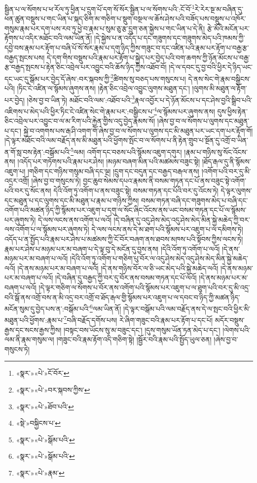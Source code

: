 སྦྱིན་པ་ལ་སོགས་པ་ཕ་རོལ་ཏུ་ཕྱིན་པ་དྲུག་པོ་དག་སོ་སོར་སྦྱིན་པ་ལ་སོགས་པའི་:ངོ་བོ་\footnote{«སྣར་»«པེ་»ངོ་བོར་}རེ་རེར་སྔ་མ་བཞིན་དུ་ཕན་ཚུན་བསྡུས་པ་གང་ཡིན་པ་སྐད་ཅིག་མ་གཅིག་པ་སྡུག་བསྔལ་ལ་ཆོས་ཤེས་པའི་བཟོད་པས་བསྡུས་པ་འཁོར་གསུམ་རྣམ་པར་དག་པས་རབ་ཏུ་ཕྱེ་བ་རྣམ་པ་སུམ་ཅུ་རྩ་དྲུག་ཅན་སྐྱེས་པ་གང་ཡིན་པ་དེ་ནི། རྩེ་མོའི་མངོན་པར་རྟོགས་པ་འདིར་མཐོང་བའི་ལམ་ཡིན་ནོ། །དེ་སྐྱེས་པ་ན་འདོད་པ་དང་གཟུགས་དང་གཟུགས་མེད་པའི་ཁམས་ཀྱི་དབྱེ་བས་རྣམ་པར་རྟོག་པ་བཞི་པོ་སོ་སོར་རྣམ་པ་དགུ་ཉིད་ཀྱིས་གཟུང་བ་དང་འཛིན་པའི་རྣམ་པར་རྟོག་པ་བརྒྱ་རྩ་བརྒྱད་སྤངས་པས། དེ་དག་གིས་བསྡུས་པའི་རྣམ་པར་རྟོག་པ་སྐྱེད་པར་བྱེད་པའི་བག་ཆགས་ཀྱི་ཉོན་མོངས་པ་བརྒྱ་རྩ་བརྒྱད་སྤངས་པ་རྟེན་ཅིང་འབྲེལ་པར་འབྱུང་བའི་ཆོས་ཉིད་ཀྱིས་འཐོབ་བོ། །དེ་ལ་དབང་དུ་བྱ་བའི་ཕྱིར་དེ་ཉིད་ཡང་དང་ཡང་དུ་སྒོམ་པར་བྱེད་དོ་ཞེས་:བར་སྐབས་ཀྱི་\footnote{«སྣར་»«པེ་»བར་སྐབས་ཀྱིས་}ཚིགས་སུ་བཅད་པས་གསུངས་པ། དེ་ནས་སེང་གེ་རྣམ་བསྒྱིངས་པའི། །ཏིང་ངེ་འཛིན་ལ་སྙོམས་ཞུགས་ནས། །རྟེན་ཅིང་འབྲེལ་འབྱུང་ལུགས་མཐུན་དང་། །ལུགས་མི་མཐུན་ལ་རྟོག་པར་བྱེད། །ཅེས་བྱ་བ་ཡིན་ཏེ། མཐོང་བའི་ལམ་:འཐོབ་པའི་\footnote{«སྣར་»«པེ་»ཐོབ་པའི་}རྣལ་འབྱོར་པ་དེ་ཉོན་མོངས་པ་དང་ཤེས་བྱའི་སྒྲིབ་པའི་འཇིགས་པ་མེད་པའི་ཕྱིར་ཏིང་ངེ་འཛིན་སེང་གེ་རྣམ་པར་:བསྒྱིངས་པ་\footnote{«སྡེ་»བསྐྱིངས་པ་}ལ་སྙོམས་པར་ཞུགས་ནས། དུས་ཕྱིས་རྟེན་ཅིང་འབྲེལ་པར་འབྱུང་བ་ལ་མ་རིག་པའི་རྐྱེན་གྱིས་འདུ་བྱེད་རྣམས་སོ། །ཞེས་བྱ་བ་ལ་སོགས་པ་ལུགས་དང་མཐུན་པ་དང་། སྐྱེ་བ་འགགས་པས་རྒ་ཤི་འགག་གོ་ཞེས་བྱ་བ་ལ་སོགས་པ་ལུགས་དང་མི་མཐུན་པར་ཡང་དག་པར་རྟོག་གོ། །དེ་ལྟར་མཐོང་བའི་ལམ་བརྗོད་ནས་མི་མཐུན་པའི་ཕྱོགས་སྤོང་བ་ལ་སོགས་པ་ནི་རྟེན་གྲུབ་པ་སྔོན་དུ་འགྲོ་བ་ཡིན་ན་གོ་སླ་བས་རྟེན་:བསྒོམ་པའི་\footnote{«སྣར་»«པེ་»སྒོམ་པའི་}ལམ། འགོག་དང་བཅས་པའི་སྙོམས་འཇུག་དགུར། །རྣམ་པ་གཉིས་སུ་སོང་འོངས་ནས། །འདོད་པར་གཏོགས་པའི་རྣམ་པར་ཤེས། །མཉམ་བཞག་མིན་པའི་མཚམས་བཟུང་སྟེ། །ཐོད་རྒལ་དུ་ནི་སྙོམས་འཇུག་པ། །གཅིག་དང་གཉིས་གསུམ་བཞི་དང་ལྔ། །དྲུག་དང་བདུན་དང་བརྒྱད་བརྒལ་ནས། །འགོག་པའི་བར་དུ་མི་འདྲར་འགྲོ། །ཞེས་བྱ་བ་གསུངས་ཏེ། བྱང་ཆུབ་སེམས་དཔའ་རྣམས་ནི་བསམ་གཏན་དང་པོ་ནས་བཟུང་སྟེ་འགོག་པའི་བར་དུ་སོང་ནས། དེའི་འོག་ཏུ་འགོག་པ་ནས་བཟུང་སྟེ། བསམ་གཏན་དང་པོའི་བར་དུ་འོངས་ཏེ། དེ་ལྟར་ལུགས་དང་མཐུན་པ་དང་ལུགས་དང་མི་མཐུན་པ་རྣམ་པ་གཉིས་ཀྱིས། བསམ་གཏན་བཞི་དང་གཟུགས་མེད་པ་བཞི་དང་འགོག་པའི་མཚན་ཉིད་ཀྱི་སྙོམས་པར་འཇུག་པ་དགུ་ལ་སོང་ཞིང་འོངས་ནས་ཡང་བསམ་གཏན་དང་པོ་ལ་སྙོམས་པར་ཞུགས་ཏེ། དེ་ལས་ལངས་ནས་འགོག་པ་ལའོ། །དེ་བཞིན་དུ་འདུ་ཤེས་མེད་འདུ་ཤེས་མེད་མིན་སྐྱེ་མཆེད་ཀྱི་བར་ལས་འགོག་པ་ལ་སྙོམས་པར་ཞུགས་ཏེ། དེ་ལས་ལངས་ནས་དེ་མ་ཐག་པའི་སྙོམས་པར་འཇུག་པ་ལ་དམིགས་ཏེ། འདོད་པ་ན་སྤྱོད་པའི་རྣམ་པར་ཤེས་པ་མཚམས་ཀྱི་ངོ་བོར་བཞག་ནས་ཐབས་མཁས་པའི་སྟོབས་ཀྱིས་ལངས་ཏེ། རྣམ་པར་ཤེས་པ་མཉམ་པར་མ་བཞག་པ་དེ་ལྟ་བུ་དེ་མངོན་དུ་བྱས་ནས། །དེའི་འོག་ཏུ་འགོག་པ་ལའོ། །དེ་ནས་མཉམ་པར་མ་བཞག་པ་ལའོ། །དེའི་འོག་ཏུ་འགོག་པ་གཅིག་པུ་བོར་ལ་འདུ་ཤེས་མེད་འདུ་ཤེས་མེད་མིན་སྐྱེ་མཆེད་ལའོ། །དེ་ནས་མཉམ་པར་མ་བཞག་པ་ལའོ། །དེ་ནས་གཉིས་བོར་ལ་ཅི་ཡང་མེད་པའི་སྐྱེ་མཆེད་ལའོ། །དེ་ནས་མཉམ་པར་མ་བཞག་པ་ལའོ། །དེ་བཞིན་དུ་བརྒྱད་ཀྱི་བར་དུ་བོར་ནས་བསམ་གཏན་དང་པོ་ལའོ། །དེ་ནས་མཉམ་པར་མ་བཞག་པ་ལའོ། །དེ་ལྟར་གཅིག་ལ་སོགས་པ་བོར་ནས་འགོག་པའི་སྙོམས་པར་འཇུག་པ་ལ་ཐུག་པའི་བར་དུ་མི་འདྲ་བའི་སྒོ་ནས་འགྲོ་བས་ན་མི་འདྲ་བར་འགྲོ་བ་ཐོད་རྒལ་གྱི་སྙོམས་པར་འཇུག་པ་ལ་དབང་བ་ཉིད་ཀྱི་མཚན་ཉིད་མངོན་སུམ་དུ་བྱེད་པས་ན་:བསྒོམ་པའི་\footnote{«སྣར་»«པེ་»སྒོམ་པའི་}ལམ་ཡིན་ནོ། །དེ་ལྟར་བསྒོམ་པའི་ལམ་བརྗོད་ནས་དེ་ལ་སྤང་བའི་ཕྱིར་མི་མཐུན་པའི་ཕྱོགས་:རྣམ་པ་\footnote{«སྣར་»«པེ་»རྣམ་}བཞི་བརྗོད་དགོས་པས། རེ་ཞིག་གཟུང་བའི་རྣམ་པར་རྟོག་པ་དང་པོ། མདོར་བསྡུས་རྒྱས་དང་སངས་རྒྱས་ཀྱིས། །བསྟང་བས་ཡོངས་སུ་མ་བཟུང་དང་། །དུས་གསུམ་ཡོན་ཏན་མེད་པ་དང་། །ལེགས་པའི་ལམ་ནི་རྣམ་གསུམ་ལ། །གཟུང་བའི་རྣམ་རྟོག་འདི་གཅིག་སྟེ། །སྦྱོར་བའི་རྣམ་པའི་སྤྱོད་ཡུལ་ཅན། །ཞེས་བྱ་བ་གསུངས་ཏེ། 